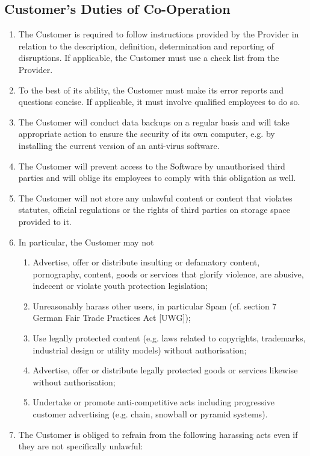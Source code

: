 \documentclass{terms}
\begin{document}
\subsection{Customer’s Duties of Co-Operation}
\begin{enumerate}
\item The Customer is required to follow instructions provided by the Provider in relation to the description, definition, determination and reporting of disruptions. If applicable, the Customer must use a check list from the Provider.
\item To the best of its ability, the Customer must make its error reports and questions concise. If applicable, it must involve qualified employees to do so.
\item The Customer will conduct data backups on a regular basis and will take appropriate action to ensure the security of its own computer, e.g. by installing the current version of an anti-virus software.
\item The Customer will prevent access to the Software by unauthorised third parties and will oblige its employees to comply with this obligation as well.
\item The Customer will not store any unlawful content or content that violates statutes, official regulations or the rights of third parties on storage space provided to it. 
\item In particular, the Customer may not \begin{enumerate}
\item Advertise, offer or distribute insulting or defamatory content, pornography, content, goods or services that glorify violence, are abusive, indecent or violate youth protection legislation;
\item Unreasonably harass other users, in particular Spam (cf. section 7 German Fair Trade Practices Act [UWG]);
\item Use legally protected content (e.g. laws related to copyrights, trademarks, industrial design or utility models) without authorisation;
\item Advertise, offer or distribute legally protected goods or services likewise without authorisation;
\item Undertake or promote anti-competitive acts including progressive customer advertising (e.g. chain, snowball or pyramid systems).
\end{enumerate}
\item The Customer is obliged to refrain from the following harassing acts even if they are not specifically unlawful:\begin{enumerate}

\end{enumerate}
\end{enumerate}
\end{document}

